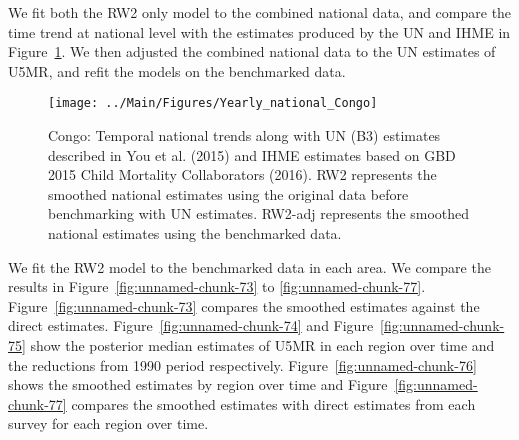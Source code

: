 \documentclass[12pt]{article}\usepackage[]{graphicx}\usepackage[]{color}
\newenvironment{knitrout}{}{} %
\begin{document}
We fit both the RW2 only model to the combined national data, and compare the time trend at national level with the estimates produced by the UN and IHME in Figure~\ref{fig:unnamed-chunk-72}. We then adjusted the combined national data to the UN estimates of U5MR, and refit the models on the benchmarked data. 

\begin{knitrout}
\color{fgcolor}\begin{figure}[bht]

{\centering \texttt{[image: ../Main/Figures/Yearly\_national\_Congo]} 

}

\caption[Congo]{Congo: Temporal national trends along with UN (B3) estimates described in You et al. (2015) and IHME estimates based on GBD 2015 Child Mortality Collaborators (2016). RW2 represents the smoothed national estimates using the original data before benchmarking with UN estimates. RW2-adj represents the smoothed national estimates using the benchmarked data.}\label{fig:unnamed-chunk-72}
\end{figure}


\end{knitrout}
 

We fit the RW2 model to the benchmarked data in each area. 
We compare the results in Figure~\ref{fig:unnamed-chunk-73} to \ref{fig:unnamed-chunk-77}.
Figure~\ref{fig:unnamed-chunk-73} compares the smoothed estimates against the direct estimates. Figure~\ref{fig:unnamed-chunk-74} and Figure~\ref{fig:unnamed-chunk-75} show the posterior median estimates of U5MR in each region over time and the reductions from 1990 period respectively.
Figure~\ref{fig:unnamed-chunk-76} shows the smoothed estimates by region over time and Figure~\ref{fig:unnamed-chunk-77} compares the smoothed estimates with direct estimates from each survey for each region over time.




\end{document}
